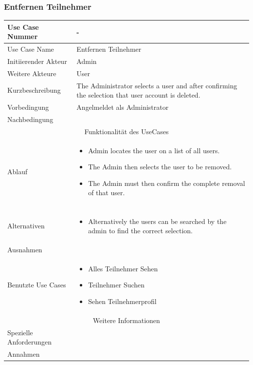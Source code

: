 \documentclass[10pt,a4paper]{article}
\begin{document}
	\subsubsection{Entfernen Teilnehmer}
	\begin{tabular}{|l|p{.5\linewidth}|}
	\hline Use Case Nummer & - \\ 
	\hline Use Case Name & Entfernen Teilnehmer \\ 
	\hline Initiierender Akteur & Admin \\
	\hline Weitere Akteure & User \\
	\hline Kurzbeschreibung & The Administrator selects a user and after confirming the selection that user account is deleted. \\
	\hline Vorbedingung & Angelmeldet als Administrator \\
	\hline Nachbedingung &  \\
	\hline \multicolumn{2}{|c|}{Funktionalität des UseCases}\\
	\hline Ablauf & \begin{itemize}
			\item Admin locates the user on a list of all users.
			\item The Admin then selects the user to be removed.
			\item The Admin must then confirm the complete removal of that user.
		\end{itemize} \\ \\
	\hline Alternativen & \begin{itemize}
			\item Alternatively the users can be searched by the admin to find the correct selection.
		\end{itemize} \\
	\hline Ausnahmen &  \\
	\hline Benutzte Use Cases & \begin{itemize}
			\item Alles Teilnehmer Sehen
			\item Teilnehmer Suchen
			\item Sehen Teilnehmerprofil
		\end{itemize} \\
	\hline \multicolumn{2}{|c|}{Weitere Informationen} \\
	\hline Spezielle Anforderungen &  \\
	\hline Annahmen &  \\
	\hline
	\end{tabular} 
	
\end{document}
